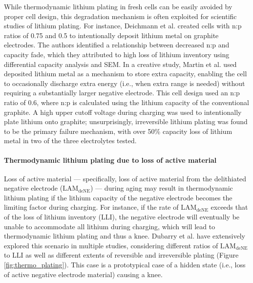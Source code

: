 \documentclass[journal=jpclcd,manuscript=article]{achemso}
\begin{document}
While thermodynamic lithium plating in fresh cells can be easily avoided by proper cell design, this degradation mechanism is often exploited for scientific studies of lithium plating.
For instance, Deichmann et al.\cite{deichmann_investigating_2020} created cells with n:p ratios of 0.75 and 0.5 to intentionally deposit lithium metal on graphite electrodes. The authors identified a relationship between decreased n:p and capacity fade, which they attributed to high loss of lithium inventory using differential capacity analysis and SEM. In a creative study, Martin et al.\cite{martin_cycling_2020} used deposited lithium metal as a mechanism to store extra capacity, enabling the cell to occasionally discharge extra energy (i.e., when extra range is needed) without requiring a substantially larger negative electrode. This cell design used an n:p ratio of 0.6, where n:p is calculated using the lithium capacity of the conventional graphite. A high upper cutoff voltage during charging was used to intentionally plate lithium onto graphite; unsurprisingly, irreversible lithium plating was found to be the primary failure mechanism, with over 50\% capacity loss of lithium metal in two of the three electrolytes tested.

\paragraph{Thermodynamic lithium plating due to loss of active material}

Loss of active material --- specifically, loss of active material from the delithiated negative electrode ($\mathrm{LAM_{deNE}}$) --- during aging may result in thermodynamic lithium plating if the lithium capacity of the negative electrode becomes the limiting factor during charging. For instance, if the rate of $\mathrm{LAM_{deNE}}$ exceeds that of the loss of lithium inventory (LLI), the negative electrode will eventually be unable to accommodate all lithium during charging, which will lead to thermodynamic lithium plating and thus a knee. Dubarry et al.\cite{ansean_operando_2017, dubarry_durability_2018, baure_synthetic_2019, dubarry_big_2020} have extensively explored this scenario in multiple studies, considering different ratios of $\mathrm{LAM_{deNE}}$ to LLI as well as different extents of reversible and irreversible plating (Figure \ref{fig:thermo_plating}). This case is a prototypical case of a hidden state (i.e., loss of active negative electrode material) causing a knee.
\end{document}
